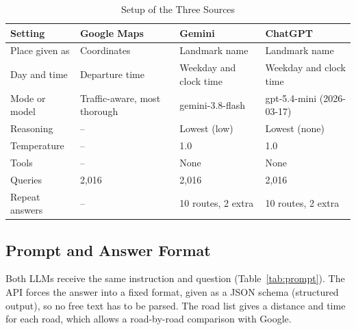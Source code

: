 \documentclass[conference]{IEEEtran}
\begin{document}
\begin{table}[!htb]
\caption{Setup of the Three Sources}
\label{tab:setup}
\centering
\setlength{\tabcolsep}{3pt}
\begin{tabular}{L{1.55cm}L{2.1cm}L{2.1cm}L{2.1cm}}
\hline
Setting & Google Maps & Gemini & ChatGPT \\
\hline
Place given as & Coordinates & Landmark name & Landmark name \\
Day and time & Departure time & Weekday and clock time & Weekday and clock time \\
Mode or model & Traffic-aware, most thorough & gemini-3.8-flash & gpt-5.4-mini (2026-03-17) \\
Reasoning & -- & Lowest (low) & Lowest (none) \\
Temperature & -- & 1.0 & 1.0 \\
Tools & -- & None & None \\
Queries & 2,016 & 2,016 & 2,016 \\
Repeat answers & -- & 10 routes, 2 extra & 10 routes, 2 extra \\
\hline
\end{tabular}
\end{table}

\subsection{Prompt and Answer Format}
Both LLMs receive the same instruction and question (Table~\ref{tab:prompt}). The API forces the answer into a fixed format, given as a JSON schema (structured output), so no free text has to be parsed. The road list gives a distance and time for each road, which allows a road-by-road comparison with Google.
\end{document}
